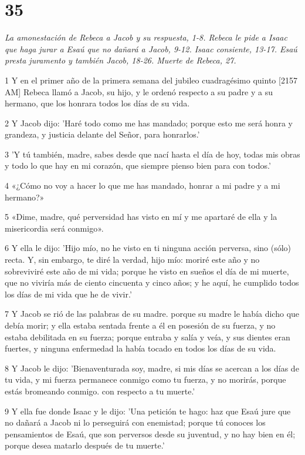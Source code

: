 \chapter{35}

\par \textit{La amonestación de Rebeca a Jacob y su respuesta, 1-8. Rebeca le pide a Isaac que haga jurar a Esaú que no dañará a Jacob, 9-12. Isaac consiente, 13-17. Esaú presta juramento y también Jacob, 18-26. Muerte de Rebeca, 27.}

\par 1 Y en el primer año de la primera semana del jubileo cuadragésimo quinto [2157 AM] Rebeca llamó a Jacob, su hijo, y le ordenó respecto a su padre y a su hermano, que los honrara todos los días de su vida.
\par 2 Y Jacob dijo: 'Haré todo como me has mandado; porque esto me será honra y grandeza, y justicia delante del Señor, para honrarlos.'
\par 3 'Y tú también, madre, sabes desde que nací hasta el día de hoy, todas mis obras y todo lo que hay en mi corazón, que siempre pienso bien para con todos.'
\par 4 «¿Cómo no voy a hacer lo que me has mandado, honrar a mi padre y a mi hermano?»
\par 5 «Dime, madre, qué perversidad has visto en mí y me apartaré de ella y la misericordia será conmigo».
\par 6 Y ella le dijo: 'Hijo mío, no he visto en ti ninguna acción perversa, sino (sólo) recta. Y, sin embargo, te diré la verdad, hijo mío: moriré este año y no sobreviviré este año de mi vida; porque he visto en sueños el día de mi muerte, que no viviría más de ciento cincuenta y cinco años; y he aquí, he cumplido todos los días de mi vida que he de vivir.'
\par 7 Y Jacob se rió de las palabras de su madre. porque su madre le había dicho que debía morir; y ella estaba sentada frente a él en posesión de su fuerza, y no estaba debilitada en su fuerza; porque entraba y salía y veía, y sus dientes eran fuertes, y ninguna enfermedad la había tocado en todos los días de su vida.
\par 8 Y Jacob le dijo: 'Bienaventurada soy, madre, si mis días se acercan a los días de tu vida, y mi fuerza permanece conmigo como tu fuerza, y no morirás, porque estás bromeando conmigo. con respecto a tu muerte.'
\par 9 Y ella fue donde Isaac y le dijo: 'Una petición te hago: haz que Esaú jure que no dañará a Jacob ni lo perseguirá con enemistad; porque tú conoces los pensamientos de Esaú, que son perversos desde su juventud, y no hay bien en él; porque desea matarlo después de tu muerte.'
